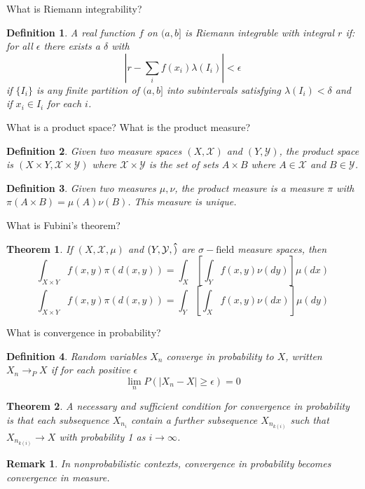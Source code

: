 \documentclass[avery5388,grid,frame]{flashcards}
\newcommand{\sigf}{\sigma-\text{field}}
\newtheorem*{theorem}{Theorem}
\newtheorem*{definition}{Definition}
\newtheorem*{remark}{Remark}
\begin{document}
\begin{flashcard}
    {What is Riemann integrability?}
    \begin{definition}
        A real function $f$ on $(a,b]$ is Riemann integrable with integral $r$ if: for all $\epsilon$ there exists a $\delta$ with
        $$| r - \sum_i f(x_i) \lambda(I_i) | < \epsilon$$
        if $\{ I_i \}$ is any finite partition of $(a,b]$ into subintervals satisfying $\lambda(I_i) < \delta$ and if $x_i \in I_i$ for each $i$.
    \end{definition}
\end{flashcard}


\begin{flashcard}
    {What is a product space? What is the product measure?}
    \begin{definition}
        Given two measure spaces $(X,\mathcal X)$ and $(Y,\mathcal Y)$, the product space is $(X \times Y, \mathcal X \times \mathcal Y)$ where $\mathcal X \times \mathcal Y$ is the set of sets $A \times B$ where $A \in \mathcal X$ and $B \in \mathcal Y$.
    \end{definition}

    \begin{definition}
        Given two measures $\mu, \nu$, the product measure is a measure $\pi$ with $\pi(A \times B) = \mu(A) \nu(B)$. This measure is unique.
    \end{definition}
\end{flashcard}


\begin{flashcard}
    {What is Fubini's theorem?}
    \begin{theorem}
        If $(X, \mathcal X, \mu)$ and $(Y, \mathcal Y, \vu)$ are $\sigf$ measure spaces, then
        $$\int_{X \times Y} f(x,y) \pi(d(x,y)) = \int_X \left [ \int_Y f(x,y) \nu(dy) \right ] \mu(dx)$$
        $$\int_{X \times Y} f(x,y) \pi(d(x,y)) = \int_Y \left [ \int_X f(x,y) \nu(dx) \right ] \mu(dy)$$
    \end{theorem}
\end{flashcard}


\begin{flashcard}
    {What is convergence in probability?}
    \begin{definition}
        Random variables $X_n$ converge in probability to $X$, written $X_n \rightarrow_P X$ if for each positive $\epsilon$
        $$\lim_n P(|X_n - X| \geq \epsilon) = 0$$
    \end{definition}

    \begin{theorem}
        A necessary and sufficient condition for convergence in probability is that each subsequence $X_{n_i}$ contain a further subsequence $X_{n_{k(i)}}$ such that $X_{n_{k(i)}} \rightarrow X$ with probability 1 as $i \rightarrow \infty$.
    \end{theorem}

    \begin{remark}
        In nonprobabilistic contexts, convergence in probability becomes convergence in measure.
    \end{remark}
\end{flashcard}
\end{document}
